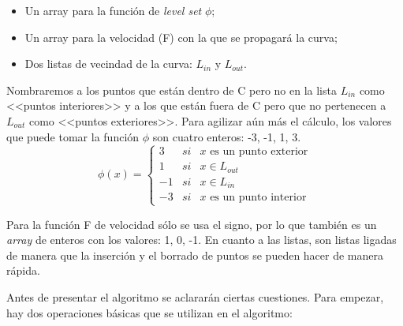 \begin{itemize}
	\item Un array para la funci\'{o}n de \textit{level set }$\phi$;
	\item Un array para la velocidad (F) con la que se propagar\'{a} la curva;
	\item Dos listas de vecindad de la curva: $L_{in}$ y $L_{out}$.	
\end{itemize}

Nombraremos a los puntos que est\'{a}n dentro de C pero no en la lista $L_{in}$ como <<puntos interiores>> y a los que est\'{a}n fuera de C pero que no pertenecen a $L_{out}$ como <<puntos exteriores>>. Para agilizar a\'{u}n m\'{a}s el c\'{a}lculo, los valores que puede tomar la funci\'{o}n $\phi$ son cuatro enteros: {-3, -1, 1, 3}.
\begin{equation}\label{phi-levelSetEcuation}
\phi (x) = 
\left \{
\begin{array}{rcl}
3 & si & x \mbox{ es un punto exterior} \\
1 & si & x \in L_{out} \\ 
-1 & si & x \in L_{in} \\
-3 & si & x \mbox{ es un punto interior}
\end{array}
\right .
\end{equation}

 Para la funci\'{o}n F de velocidad s\'{o}lo se usa el signo, por lo que tambi\'{e}n es un \textit{array} de enteros con los valores: {1, 0, -1}. En cuanto a las listas, son listas ligadas de manera que la inserci\'{o}n y el borrado de puntos se pueden hacer de manera r\'{a}pida. 
 
 Antes de presentar el algoritmo se aclarar\'{a}n ciertas cuestiones. Para empezar, hay dos operaciones b\'{a}sicas que se utilizan en el algoritmo:
 
